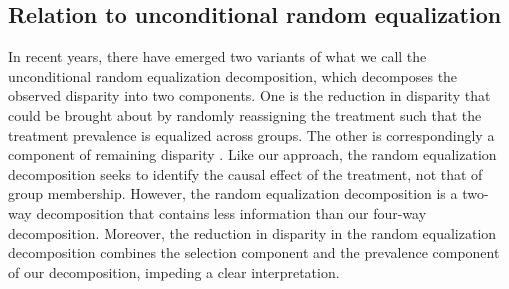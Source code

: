 \documentclass[12pt,a4paper]{article}
\begin{document}
\subsection{Relation to unconditional random equalization}
In recent years, there have emerged two variants of what we call the unconditional random equalization decomposition, which decomposes the observed disparity into two components. One is the reduction in disparity that could be brought about by randomly reassigning the treatment such that the treatment prevalence is equalized across groups. The other is correspondingly a component of remaining disparity \citep{vanderweele_causal_2014, jackson_decomposition_2018, sudharsanan_educational_2021, lundberg_gap-closing_2022}. Like our approach, the random equalization decomposition seeks to identify the causal effect of the treatment, not that of group membership. However, the random equalization decomposition is a two-way decomposition that contains less information than our four-way decomposition. Moreover, the reduction in disparity in the random equalization decomposition combines the selection component and the prevalence component of our decomposition, impeding a clear interpretation.

\end{document}
